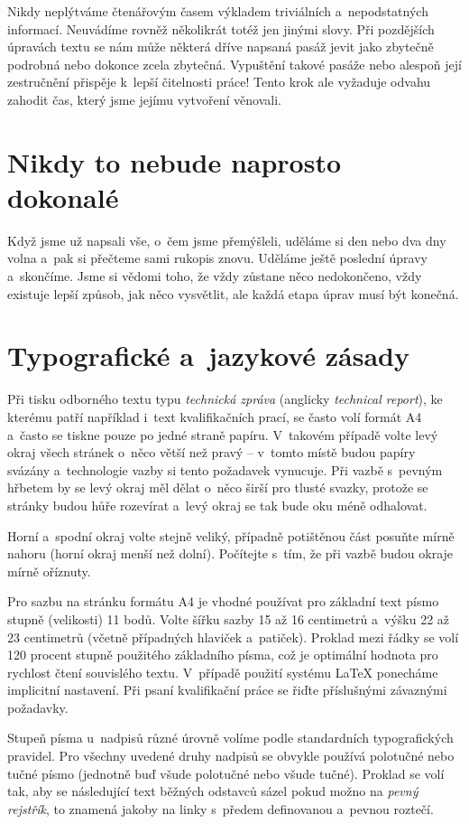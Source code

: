 \documentclass[english,cover]{fitthesis} %
\begin{document}
Nikdy neplýtváme čtenářovým časem výkladem triviálních a~nepodstatných informací. Neuvádíme rovněž několikrát totéž jen jinými slovy. Při pozdějších úpravách textu se nám může některá dříve napsaná pasáž jevit jako zbytečně podrobná nebo dokonce zcela zbytečná. Vypuštění takové pasáže nebo alespoň její zestručnění přispěje k~lepší čitelnosti práce! Tento krok ale vyžaduje odvahu zahodit čas, který jsme jejímu vytvoření věnovali. 


\chapter{Nikdy to nebude naprosto dokonalé}
Když jsme už napsali vše, o~čem jsme přemýšleli, uděláme si den nebo dva dny volna a~pak si přečteme sami rukopis znovu. Uděláme ještě poslední úpravy a~skončíme. Jsme si vědomi toho, že vždy zůstane něco nedokončeno, vždy existuje lepší způsob, jak něco vysvětlit, ale každá etapa úprav musí být konečná.


\chapter{Typografické a~jazykové zásady}
Při tisku odborného textu typu {\it technická zpráva} (anglicky {\it technical report}), ke kterému patří například i~text kvalifikačních prací, se často volí formát A4 a~často se tiskne pouze po jedné straně papíru. V~takovém případě volte levý okraj všech stránek o~něco větší než pravý -- v~tomto místě budou papíry svázány a~technologie vazby si tento požadavek vynucuje. Při vazbě s~pevným hřbetem by se levý okraj měl dělat o~něco širší pro tlusté svazky, protože se stránky budou hůře rozevírat a~levý okraj se tak bude oku méně odhalovat.

Horní a~spodní okraj volte stejně veliký, případně potištěnou část posuňte mírně nahoru (horní okraj menší než dolní). Počítejte s~tím, že při vazbě budou okraje mírně oříznuty.

Pro sazbu na stránku formátu A4 je vhodné používat pro základní text písmo stupně (velikosti) 11 bodů. Volte šířku sazby 15 až 16 centimetrů a~výšku 22 až 23 centimetrů (včetně případných hlaviček a~patiček). Proklad mezi řádky se volí 120 procent stupně použitého základního písma, což je optimální hodnota pro rychlost čtení souvislého textu. V~případě použití systému LaTeX ponecháme implicitní nastavení. Při psaní kvalifikační práce se řiďte příslušnými závaznými požadavky.

Stupeň písma u~nadpisů různé úrovně volíme podle standardních typografických pravidel. 
Pro všechny uvedené druhy nadpisů se obvykle používá polotučné nebo tučné písmo (jednotně buď všude polotučné nebo všude tučné). Proklad se volí tak, aby se následující text běžných odstavců sázel pokud možno na {\it pevný rejstřík}, to znamená jakoby na linky s~předem definovanou a~pevnou roztečí.
\end{document}

